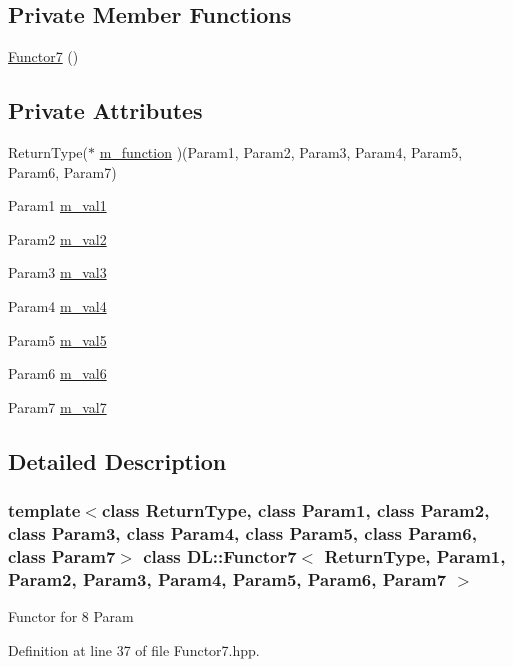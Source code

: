 \subsection*{Private Member Functions}
\begin{CompactItemize}
\item 
\hyperlink{classDL_1_1Functor7_d0}{Functor7} ()
\end{CompactItemize}
\subsection*{Private Attributes}
\begin{CompactItemize}
\item 
Return\-Type($\ast$ \hyperlink{classDL_1_1Functor7_r0}{m\_\-function} )(Param1, Param2, Param3, Param4, Param5, Param6, Param7)
\item 
Param1 \hyperlink{classDL_1_1Functor7_r1}{m\_\-val1}
\item 
Param2 \hyperlink{classDL_1_1Functor7_r2}{m\_\-val2}
\item 
Param3 \hyperlink{classDL_1_1Functor7_r3}{m\_\-val3}
\item 
Param4 \hyperlink{classDL_1_1Functor7_r4}{m\_\-val4}
\item 
Param5 \hyperlink{classDL_1_1Functor7_r5}{m\_\-val5}
\item 
Param6 \hyperlink{classDL_1_1Functor7_r6}{m\_\-val6}
\item 
Param7 \hyperlink{classDL_1_1Functor7_r7}{m\_\-val7}
\end{CompactItemize}


\subsection{Detailed Description}
\subsubsection*{template$<$class Return\-Type, class Param1, class Param2, class Param3, class Param4, class Param5, class Param6, class Param7$>$ class DL::Functor7$<$ Return\-Type, Param1, Param2, Param3, Param4, Param5, Param6, Param7 $>$}

Functor for 8 Param



Definition at line 37 of file Functor7.hpp.

